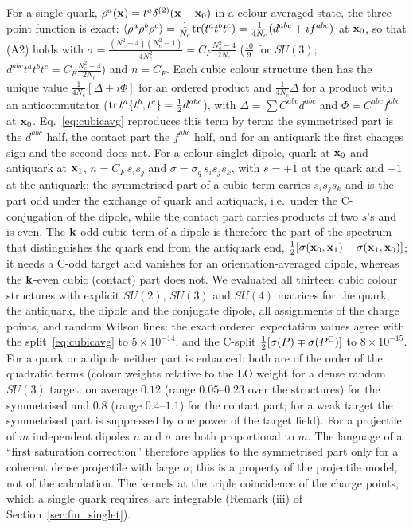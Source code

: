 For a single quark, $\rho^a(\mathbf{x})=t^a\delta^{(2)}(\mathbf{x}-\mathbf{x}_0)$ in a colour-averaged state, the three-point function is exact: $\langle\rho^a\rho^b\rho^c\rangle=\frac1{N_c}{\rm tr}(t^at^bt^c)=\frac{1}{4N_c}(d^{abc}+if^{abc})$ at $\mathbf{x}_0$, so that (A2) holds with $\sigma=\frac{(N_c^2-4)(N_c^2-1)}{4N_c^2}=C_F\frac{N_c^2-4}{2N_c}$ ($\frac{10}{9}$ for $SU(3)$; $d^{abc}t^at^bt^c=C_F\frac{N_c^2-4}{2N_c}$) and $n=C_F$. Each cubic colour structure then has the unique value $\frac{1}{4N_c}[\Delta+i\Phi]$ for an ordered product and $\frac{1}{4N_c}\Delta$ for a product with an anticommutator (${\rm tr}\,t^a\{t^b,t^c\}=\frac12d^{abc}$), with $\Delta=\sum C^{abc}d^{abc}$ and $\Phi=C^{abc}f^{abc}$ at $\mathbf{x}_0$. Eq.~\eqref{eq:cubicavg} reproduces this term by term: the symmetrised part is the $d^{abc}$ half, the contact part the $f^{abc}$ half, and for an antiquark the first changes sign and the second does not. For a colour-singlet dipole, quark at $\mathbf{x}_0$ and antiquark at $\mathbf{x}_1$, $n=C_F\,s_is_j$ and $\sigma=\sigma_q\,s_is_js_k$, with $s=+1$ at the quark and $-1$ at the antiquark; the symmetrised part of a cubic term carries $s_is_js_k$ and is the part odd under the exchange of quark and antiquark, i.e.\ under the C-conjugation of the dipole, while the contact part carries products of two $s$'s and is even. The $\mathbf{k}$-odd cubic term of a dipole is therefore the part of the spectrum that distinguishes the quark end from the antiquark end, $\frac12[\sigma(\mathbf{x}_0,\mathbf{x}_1)-\sigma(\mathbf{x}_1,\mathbf{x}_0)]$; it needs a C-odd target and vanishes for an orientation-averaged dipole, whereas the $\mathbf{k}$-even cubic (contact) part does not. We evaluated all thirteen cubic colour structures with explicit $SU(2)$, $SU(3)$ and $SU(4)$ matrices for the quark, the antiquark, the dipole and the conjugate dipole, all assignments of the charge points, and random Wilson lines: the exact ordered expectation values agree with the split~\eqref{eq:cubicavg} to $5\times10^{-14}$, and the C-split $\frac12[\sigma(P)\mp\sigma(P^{\rm C})]$ to $8\times10^{-15}$. For a quark or a dipole neither part is enhanced: both are of the order of the quadratic terms (colour weights relative to the LO weight for a dense random $SU(3)$ target: on average $0.12$ (range $0.05$--$0.23$ over the structures) for the symmetrised and $0.8$ (range $0.4$--$1.1$) for the contact part; for a weak target the symmetrised part is suppressed by one power of the target field). For a projectile of $m$ independent dipoles $n$ and $\sigma$ are both proportional to $m$. The language of a ``first saturation correction'' therefore applies to the symmetrised part only for a coherent dense projectile with large $\sigma$; this is a property of the projectile model, not of the calculation. The kernels at the triple coincidence of the charge points, which a single quark requires, are integrable (Remark (iii) of Section~\ref{sec:fin_singlet}).

